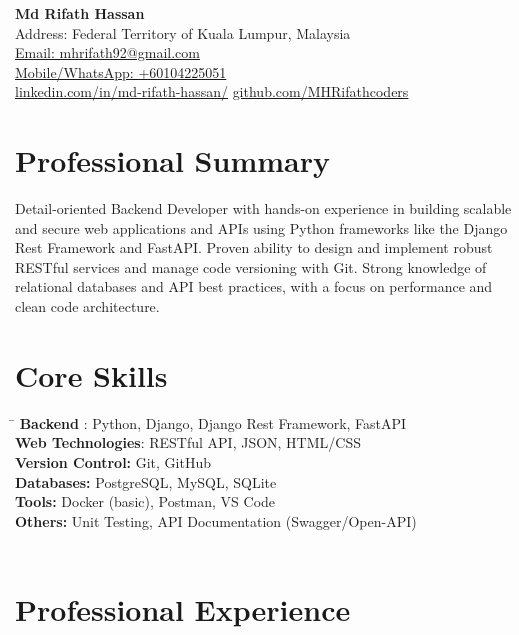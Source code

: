 \documentclass[a4paper,10pt]{article}
\begin{document}
\begin{center}
    {\LARGE \textbf{Md Rifath Hassan}} \\
    \vspace{2mm}
    Address: Federal Territory of Kuala Lumpur, Malaysia \\
    \href{mailto:mhrifath92@gmail.com}{Email: mhrifath92@gmail.com} \\
    \href{tel:+60104225051}{Mobile/WhatsApp: +60104225051} \\
    \href{https://www.linkedin.com/in/md-rifath-hassan/}{linkedin.com/in/md-rifath-hassan/} \quad
    \href{https://github.com/MHRifathcoders}{github.com/MHRifathcoders} \\
    \vspace{1mm}
\end{center}

\section*{Professional Summary}
Detail-oriented Backend Developer with hands-on experience in building scalable and secure web applications and APIs using Python frameworks like the Django Rest Framework and FastAPI. Proven ability to design and implement robust RESTful services and manage code versioning with Git. Strong knowledge of relational databases and API best practices, with a focus on performance and clean code architecture.

\section*{Core Skills}
\begin{tabbing}
\hspace{3cm} \= \kill
\textbf{Backend} :\> Python, Django, Django Rest Framework, FastAPI \\
\textbf{Web Technologies}: RESTful API, JSON, HTML/CSS  \\
\textbf{Version Control:} \> Git, GitHub \\
\textbf{Databases:} \> PostgreSQL, MySQL, SQLite \\
\textbf{Tools:} \> Docker (basic), Postman, VS Code \\
\textbf{Others:} \> Unit Testing, API Documentation (Swagger/Open-API) \\
 \\
\end{tabbing}

\section*{Professional Experience}
\end{document}
